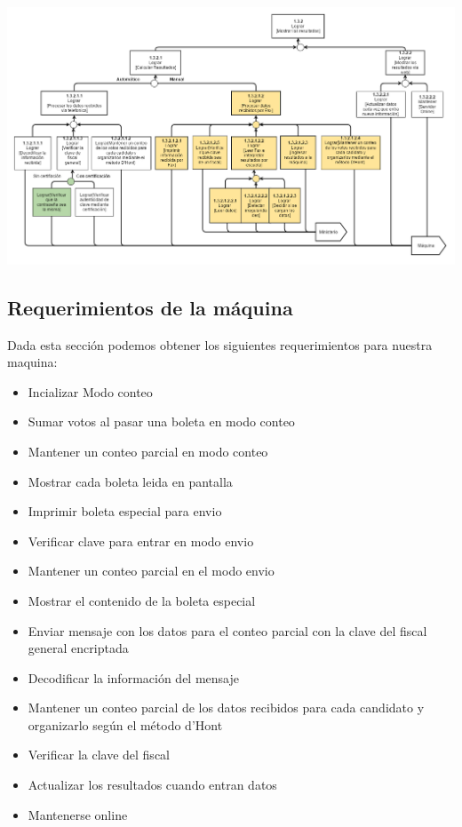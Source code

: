 \\
\includegraphics[scale=0.53]{imagenes/Diagramas/13/132.png}

\newpage
\subsection{Requerimientos de la m\'aquina}

Dada esta sección podemos obtener los siguientes requerimientos para nuestra maquina:
\begin{itemize}
\item Incializar Modo conteo
\item Sumar votos al pasar una boleta en modo conteo
\item Mantener un conteo parcial en modo conteo
\item Mostrar cada boleta leida en pantalla
\item Imprimir boleta especial para envio
\item Verificar clave para entrar en modo envio
\item Mantener un conteo parcial en el modo envio
\item Mostrar el contenido de la boleta especial
\item Enviar mensaje con los datos para el conteo parcial con la clave del fiscal general encriptada
\item Decodificar la información del mensaje
\item Mantener un conteo parcial de los datos recibidos para cada candidato y organizarlo según el método d'Hont
\item Verificar la clave del fiscal
\item Actualizar los resultados cuando entran datos
\item Mantenerse online
\end{itemize}